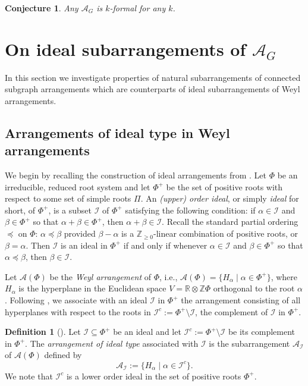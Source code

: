 \documentclass[12pt]{amsart}
\newcommand\CA{{\mathscr A}}
\newcommand\CI{{\mathcal I}}
\newcommand\BBR{{\mathbb R}}
\newcommand\BBZ{{\mathbb Z}}
\numberwithin{equation}{section}
\theoremstyle{plain}
\newtheorem{conjecture}[equation]{Conjecture}
\theoremstyle{definition}
\newtheorem{defn}[equation]{Definition}
\begin{document}
\begin{conjecture}
	Any $\CA_G$ is $k$-formal for any $k$.
\end{conjecture}



\section{On ideal subarrangements of $\CA_G$}
\label{sec:idealAG}

In this section we investigate properties of natural subarrangements 
of connected subgraph arrangements which are counterparts of ideal subarrangements of Weyl arrangements. 


\subsection{Arrangements of ideal type in Weyl arrangements}
\label{sec:ideal}
We begin by recalling the construction of ideal arrangements from \cite[\S 11]{sommerstymoczko}.
Let $\Phi$ be an irreducible, reduced root system
and let $\Phi^+$ be the set of positive roots
with respect to some set of simple roots $\Pi$.
An \emph{(upper) order ideal},
or simply \emph{ideal} for short,
of  $\Phi^+$, is a subset $\CI$  of $\Phi^+$
satisfying the following condition:
if $\alpha \in \CI$ and $\beta \in \Phi^+$ so that
$\alpha + \beta \in \Phi^+$, then $\alpha + \beta \in \CI$.
Recall the standard partial ordering
$\preceq$ on $\Phi$: $\alpha \preceq \beta$
provided $\beta - \alpha$ is a $\BBZ_{\ge0}$-linear combination
of positive roots, or $\beta = \alpha$. Then $\CI$ is an ideal in $\Phi^+$
if and only if whenever
$\alpha \in \CI$ and $\beta \in \Phi^+$ so that
$\alpha \preceq \beta$, then $\beta \in \CI$.


Let $\CA(\Phi)$ be the \emph{Weyl arrangement} of $\Phi$,
i.e., $\CA(\Phi) = \{ H_\alpha \mid \alpha \in \Phi^+\}$,
where $H_\alpha$ is the hyperplane in the Euclidean space
$V = \BBR \otimes \BBZ \Phi$ orthogonal to the root $\alpha$.
Following \cite[\S 11]{sommerstymoczko},
we associate with an ideal $\CI$ in $\Phi^+$ the arrangement
consisting of all hyperplanes with respect to the roots in $\CI^c := \Phi^+ \setminus \CI$, the complement of $\CI$ in
$\Phi^+$.

\begin{defn}[{\cite[\S 11]{sommerstymoczko}}]
	\label{def:idealtype}
 Let $\CI \subseteq \Phi^+$ be an ideal and let
$\CI^c := \Phi^+ \setminus \CI$
be its complement in
$\Phi^+$.
	The \emph{arrangement of ideal type} associated with
	$\CI$ is the subarrangement $\CA_\CI$
	of $\CA(\Phi)$ defined by
	\[
	\CA_\CI := \{ H_\alpha \mid \alpha \in \CI^c\}.
	\]
 We note that $\CI^c$
 is a lower order ideal in the set of positive roots  $\Phi^+$.  
\end{defn}
\end{document}
